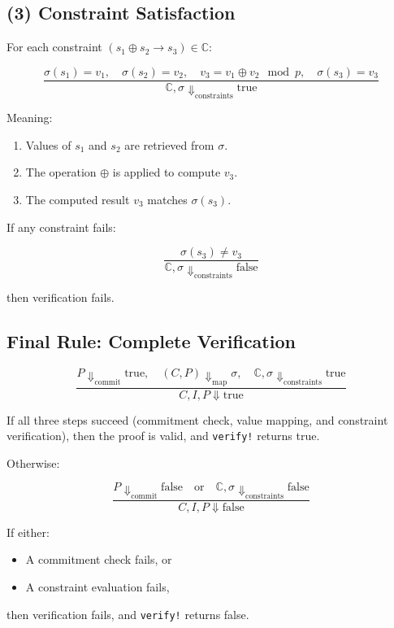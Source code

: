 \documentclass{article}
\begin{document}
\subsection{(3) Constraint Satisfaction}

For each constraint $(s_1 \oplus s_2 \to s_3) \in \mathbb{C}$:

\[
\frac{ \sigma(s_1) = v_1, \quad \sigma(s_2) = v_2, \quad v_3 = v_1 \oplus v_2 \mod p, \quad \sigma(s_3) = v_3 }
{ \mathbb{C}, \sigma \Downarrow_{\text{constraints}} \text{true} }
\]

Meaning:

\begin{enumerate}
    \item Values of $s_1$ and $s_2$ are retrieved from $\sigma$.
    \item The operation $\oplus$ is applied to compute $v_3$.
    \item The computed result $v_3$ matches $\sigma(s_3)$.
\end{enumerate}

If any constraint fails:

\[
\frac{ \sigma(s_3) \neq v_3 }
{ \mathbb{C}, \sigma \Downarrow_{\text{constraints}} \text{false} }
\]

then verification fails.


\subsection{Final Rule: Complete Verification}

\[
\frac{ P \Downarrow_{\text{commit}} \text{true}, \quad (C, P) \Downarrow_{\text{map}} \sigma, \quad \mathbb{C}, \sigma \Downarrow_{\text{constraints}} \text{true} }
{ C, I, P \Downarrow \text{true} }
\]

If all three steps succeed (commitment check, value mapping, and constraint verification), then the proof is valid, and \texttt{verify!} returns true.

Otherwise:

\[
\frac{ P \Downarrow_{\text{commit}} \text{false} \quad \text{or} \quad \mathbb{C}, \sigma \Downarrow_{\text{constraints}} \text{false} }
{ C, I, P \Downarrow \text{false} }
\]

If either:

\begin{itemize}
    \item A commitment check fails, or
    \item A constraint evaluation fails,
\end{itemize}

then verification fails, and \texttt{verify!} returns false.
\end{document}

